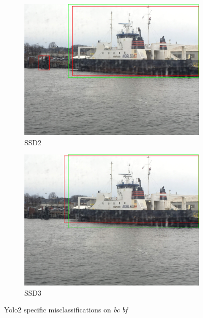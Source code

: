 \begin{figure}[h!]
\begin{subfigure}{.5\textwidth}
  \centering
  \includegraphics[width=0.8\linewidth]{results/case_buildings/ssdtrf/ssd2/3better/IMG_2570.jpg}
  \caption{SSD2}
\end{subfigure}%
\begin{subfigure}{.5\textwidth}
  \centering
  \includegraphics[width=.8\linewidth]{results/case_buildings/ssdtrf/ssd3/3better/IMG_2570.jpg}
  \caption{SSD3}
\end{subfigure}
\caption{Yolo2 specific misclassifications on \textit{bc} \textit{bf}}
\label{img:yolo2_misclas}


\end{figure}
